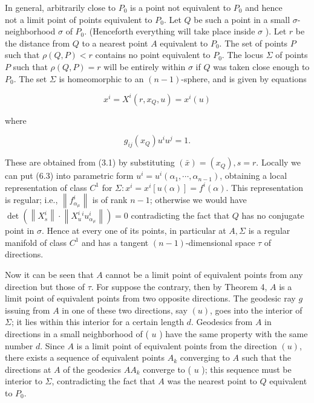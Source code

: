 \documentclass[10pt]{article}
\begin{document}
In general, arbitrarily close to $P_{0}$ is a point not equivalent to $P_{0}$ and hence\\
not a limit point of points equivalent to $P_{0}$. Let $Q$ be such a point in a small $\sigma$-neighborhood $\sigma$ of $P_{0}$. (Henceforth everything will take place inside $\sigma$ ). Let $r$ be the distance from $Q$ to a nearest point $A$ equivalent to $P_{0}$. The set of points $P$ such that $\rho(Q, P)<r$ contains no point equivalent to $P_{0}$. The locus $\Sigma$ of points $P$ such that $\rho(Q, P)=r$ will be entirely within $\sigma$ if $Q$ was taken close enough to $P_{0}$. The set $\Sigma$ is homeomorphic to an $(n-1)$-sphere, and is given by equations


\begin{equation*}
x^{i}=X^{i}\left(r, x_{Q}, u\right)=x^{i}(u) \tag{6.2}
\end{equation*}


where


\begin{equation*}
g_{i j}\left(x_{Q}\right) u^{i} u^{j}=1 . \tag{6.3}
\end{equation*}


These are obtained from (3.1) by substituting $(\bar{x})=\left(x_{Q}\right), s=r$. Locally we can put (6.3) into parametric form $u^{i}=u^{i}\left(\alpha_{1}, \cdots, \alpha_{n-1}\right)$, obtaining a local representation of class $C^{1}$ for $\Sigma: x^{i}=x^{i}[u(\alpha)]=f^{i}(\alpha)$. This representation is regular; i.e., $\left\|f_{\alpha_{\mu}}^{i}\right\|$ is of rank $n-1$; otherwise we would have $\operatorname{det}\left(\left\|X_{s}^{i}\right\| \cdot\left\|X_{u}^{i}{ }^{i} u_{\alpha_{\mu}}^{i}\right\|\right)=0$ contradicting the fact that $Q$ has no conjugate point in $\sigma$. Hence at every one of its points, in particular at $A, \Sigma$ is a regular manifold of class $C^{1}$ and has a tangent $(n-1)$-dimensional space $\tau$ of directions.

Now it can be seen that $A$ cannot be a limit point of equivalent points from any direction but those of $\tau$. For suppose the contrary, then by Theorem 4, $A$ is a limit point of equivalent points from two opposite directions. The geodesic ray $g$ issuing from $A$ in one of these two directions, say $(u)$, goes into the interior of $\Sigma$; it lies within this interior for a certain length $d$. Geodesics from $A$ in directions in a small neighborhood of ( $u$ ) have the same property with the same number $d$. Since $A$ is a limit point of equivalent points from the direction $(u)$, there exists a sequence of equivalent points $A_{k}$ converging to $A$ such that the directions at $A$ of the geodesics $A A_{k}$ converge to ( $u$ ); this sequence must be interior to $\Sigma$, contradicting the fact that $A$ was the nearest point to $Q$ equivalent to $P_{0}$.
\end{document}
